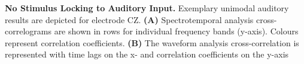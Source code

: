 \textbf{No Stimulus Locking to Auditory Input.} Exemplary unimodal auditory results
are depicted for electrode CZ. \textbf{(A)} Spectrotemporal analysis
cross-correlograms are shown in rows for individual frequency bands
(y-axis). Colours represent correlation coefficients. \textbf{(B)} The waveform
analysis cross-correlation is represented with time lags on the x- and
correlation coefficients on the y-axis
